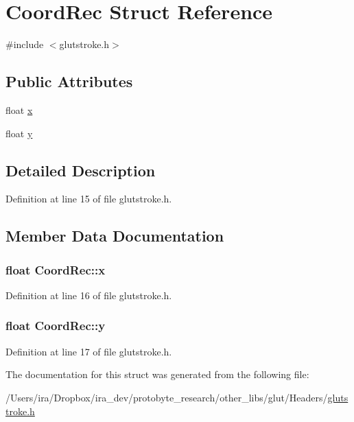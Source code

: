 \hypertarget{struct_coord_rec}{\section{Coord\-Rec Struct Reference}
\label{struct_coord_rec}
}


{\ttfamily \#include $<$glutstroke.\-h$>$}

\subsection*{Public Attributes}
\begin{DoxyCompactItemize}
\item 
float \hyperlink{struct_coord_rec_a81cf49b084c15d2774655d43f67e066f}{x}
\item 
float \hyperlink{struct_coord_rec_a390cc4367e9c463ca11e9a64bdfed671}{y}
\end{DoxyCompactItemize}


\subsection{Detailed Description}


Definition at line 15 of file glutstroke.\-h.



\subsection{Member Data Documentation}
\hypertarget{struct_coord_rec_a81cf49b084c15d2774655d43f67e066f}{
\subsubsection[{x}]{\setlength{\rightskip}{0pt plus 5cm}float Coord\-Rec\-::x}}\label{struct_coord_rec_a81cf49b084c15d2774655d43f67e066f}


Definition at line 16 of file glutstroke.\-h.

\hypertarget{struct_coord_rec_a390cc4367e9c463ca11e9a64bdfed671}{
\subsubsection[{y}]{\setlength{\rightskip}{0pt plus 5cm}float Coord\-Rec\-::y}}\label{struct_coord_rec_a390cc4367e9c463ca11e9a64bdfed671}


Definition at line 17 of file glutstroke.\-h.



The documentation for this struct was generated from the following file\-:\begin{DoxyCompactItemize}
\item 
/\-Users/ira/\-Dropbox/ira\-\_\-dev/protobyte\-\_\-research/other\-\_\-libs/glut/\-Headers/\hyperlink{glutstroke_8h}{glutstroke.\-h}\end{DoxyCompactItemize}
